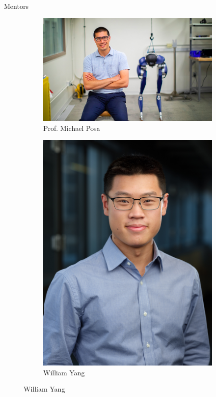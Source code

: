\begin{frame}{Mentors}
\begin{figure}[h!]
\centering
    \begin{subfigure}[b]{0.65\linewidth}
        \includegraphics[scale=0.22]{figures/Mike2.png}
        \caption{Prof. Michael Posa}
        \label{fig:Mike}
    \end{subfigure}
    \quad
    \begin{subfigure}[b]{0.3\linewidth}
       \includegraphics[scale=0.0615]{figures/william_yang.jpg}
        \caption{William Yang}
        \label{fig:Will}
    \end{subfigure}
\end{figure}
\end{frame}